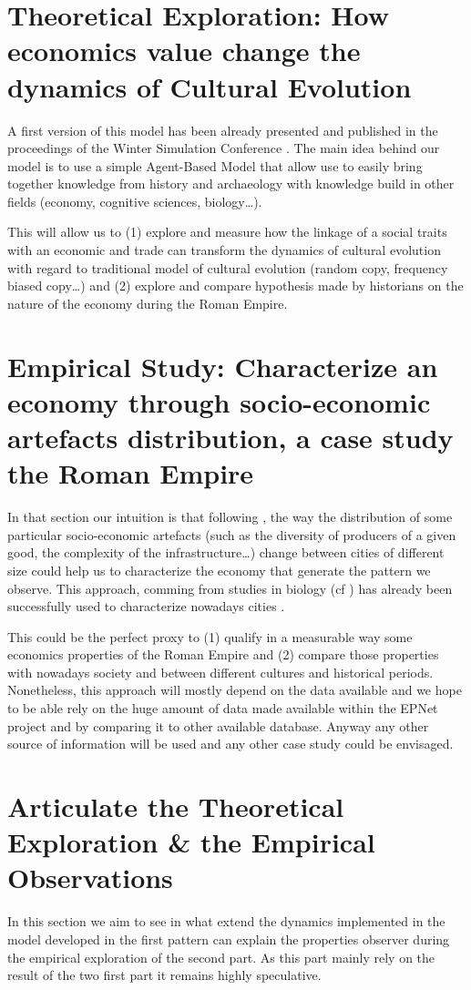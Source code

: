 \documentclass[a4paper]{article}
\begin{document}
\section{Theoretical Exploration: How economics value change the dynamics of Cultural Evolution}
A first version of this model has been already presented and published in the proceedings of the Winter Simulation Conference \cite{carrignon2015modellingthecoevolutionoftradeandcultureinpastsocieties}. The main idea behind our model is to use a simple Agent-Based Model that allow use to easily bring together knowledge from history and archaeology with knowledge build in other fields (economy, cognitive sciences, biology\ldots). 

This will allow us to (1) explore and measure how the linkage of a social traits with an economic and trade can transform the dynamics of cultural evolution with regard to traditional model of cultural evolution (random copy, frequency biased copy\ldots) and (2) explore and compare hypothesis made by historians on the nature of the economy during the Roman Empire. 

\section{Empirical Study: Characterize an economy through socio-economic artefacts distribution, a case study the Roman Empire}
In that section our intuition is that following \cite{ortman2014theprehistoryofurbanscaling}, the way the distribution of some particular socio-economic artefacts (such as the diversity of producers of a given good, the complexity of the infrastructure\ldots) change between cities of different size could help us to characterize the economy that generate the pattern we observe. This approach, comming from studies in biology (cf \cite{schmidtnielsen1984scalingwhyisanimalsizesoimportant}) has already been successfully used to characterize nowadays cities \cite{bettencourt2010aunifiedtheoryofurbanliving,batty2013theory}. 

This could be the perfect proxy to (1) qualify in a measurable way some economics properties of the Roman Empire and (2) compare those properties with nowadays society and between different cultures and historical periods. Nonetheless, this approach will mostly depend on the data available and we hope to be able rely on the huge amount of data made available within the EPNet project and by comparing it to other available database. Anyway any other source of information will be used and any other case study could be envisaged. 

\section{Articulate the Theoretical Exploration \& the Empirical Observations}
In this section we aim to see in what extend the dynamics implemented in the model developed in the first pattern can explain the properties observer during the empirical exploration of the second part. As this part mainly rely on the result of the two first part it remains highly speculative. 


\end{document}
